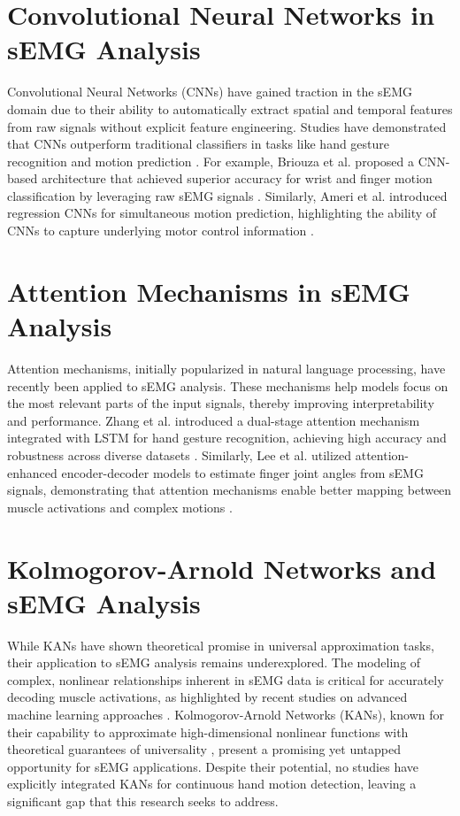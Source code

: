 \section{Convolutional Neural Networks in sEMG Analysis}
Convolutional Neural Networks (CNNs) have gained traction in the sEMG domain due to their ability to automatically extract spatial and temporal features from raw signals without explicit feature engineering. Studies have demonstrated that CNNs outperform traditional classifiers in tasks like hand gesture recognition and motion prediction \cite{briouza2021convolutional,ameri2019regression}. For example, Briouza et al. proposed a CNN-based architecture that achieved superior accuracy for wrist and finger motion classification by leveraging raw sEMG signals \cite{briouza2021convolutional}. Similarly, Ameri et al. introduced regression CNNs for simultaneous motion prediction, highlighting the ability of CNNs to capture underlying motor control information \cite{ameri2019regression}.

\section{Attention Mechanisms in sEMG Analysis}
Attention mechanisms, initially popularized in natural language processing, have recently been applied to sEMG analysis. These mechanisms help models focus on the most relevant parts of the input signals, thereby improving interpretability and performance. Zhang et al. introduced a dual-stage attention mechanism integrated with LSTM for hand gesture recognition, achieving high accuracy and robustness across diverse datasets \cite{zhang2023lstm}. Similarly, Lee et al. utilized attention-enhanced encoder-decoder models to estimate finger joint angles from sEMG signals, demonstrating that attention mechanisms enable better mapping between muscle activations and complex motions \cite{lee2022explainable}.

\section{Kolmogorov-Arnold Networks and sEMG Analysis}
While KANs have shown theoretical promise in universal approximation tasks, their application to sEMG analysis remains underexplored. The modeling of complex, nonlinear relationships inherent in sEMG data is critical for accurately decoding muscle activations, as highlighted by recent studies on advanced machine learning approaches \cite{farago2022review}. Kolmogorov-Arnold Networks (KANs), known for their capability to approximate high-dimensional nonlinear functions with theoretical guarantees of universality \cite{liu2024kan}, present a promising yet untapped opportunity for sEMG applications. Despite their potential, no studies have explicitly integrated KANs for continuous hand motion detection, leaving a significant gap that this research seeks to address.

